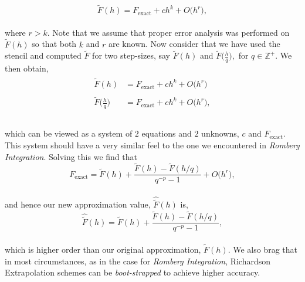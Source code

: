 \documentclass[paper=a4, fontsize=11pt]{scrartcl} %
\numberwithin{equation}{section} %
\numberwithin{figure}{section} %
\numberwithin{table}{section} %
\begin{document}
 $$\tilde{F}(h) = F_{\mbox{exact}} + ch^{k} + O\big(h^{r}\big),$$\\
 
 where $r>k$. Note that we assume that proper error analysis was performed on $\tilde{F}(h)$ so that both $k$ and $r$ are known. Now consider that we have used the stencil and computed $\tilde{F}$ for two step-sizes, say $\tilde{F}(h)$ and $\tilde{F}\big(\frac{h}{q}\big),$ for $q\in\mathbb{Z}^+.$ We then obtain,\\
 
 \begin{align}
 \nonumber
 \begin{split}
 \tilde{F}(h) &= F_{\mbox{exact}} + ch^{k} + O\big(h^{r}\big) \\  \\
 \tilde{F}\Bigg(\frac{h}{q}\Bigg) &= F_{\mbox{exact}} + ch^{k} + O\big(h^{r}\big), \\ \\
 \end{split}
 \end{align}
 
 which can be viewed as a system of $2$ equations and $2$ unknowns, $c$ and $F_{\mbox{exact}}.$ This system should have a very similar feel to the one we encountered in \emph{Romberg Integration}. Solving this we find that\\
 
 $$F_{\mbox{exact}} = \tilde{F}(h) + \frac{ \tilde{F}(h) - \tilde{F}(h/q) }{ q^{-p} - 1} + O\big(h^r\big),$$ \\
 
 and hence our new approximation value, $\hat{\tilde{F}}(h)$ is,\\
 
 $$\hat{\tilde{F}}(h) =  \tilde{F}(h) + \frac{ \tilde{F}(h) - \tilde{F}(h/q) }{ q^{-p} - 1},$$\\
 
 which is higher order than our original approximation, $\tilde{F}(h)$. We also brag that in most circumstances, as in the case for \emph{Romberg Integration}, Richardson Extrapolation schemes can be \emph{boot-strapped} to achieve higher accuracy.
 
\end{document}
